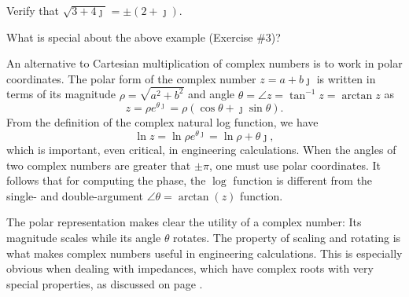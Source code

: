 \documentclass{ximera}
\begin{document}
\BEx%
Verify that $\sqrt{3+4\jmath}= \pm (2+\jmath)$.

\EEx

\BEx%
What is special about the above example (Exercise \#3)?

\EEx

An alternative to Cartesian multiplication of complex numbers is to work in polar coordinates. The polar
form of the complex number $z=a+b\jmath$ is written in terms of its magnitude $\rho = \sqrt{a^2+b^2}$ and angle
$\theta = \angle z = \tan^{-1}{z} = \arctan{z}$ as
\[
z = \rho e^{\theta\jmath} = \rho (\cos \theta  + \jmath \sin \theta ).
\]
From the definition of the complex natural log function, we have
 \[
 \ln z = \ln \rho e^{\theta\jmath} = \ln \rho + \theta\jmath,
 \]
which is important, even critical, in engineering calculations.
When the angles of two complex numbers are greater that $\pm \pi$, one must use polar coordinates.
It follows that for computing the phase, the $\log$ function is different from the single- and double-argument
$\angle \theta = \arctan(z)$ function. %


The polar representation makes clear the utility of a complex number: Its magnitude scales while its angle $\theta$ rotates.
The property of scaling and rotating is what makes complex numbers useful in engineering calculations.
This is especially obvious when dealing with impedances, which have complex roots with very special properties, as discussed on page \pageref{Lec 25}.

\label{eq:complex2x2}
\end{document}
